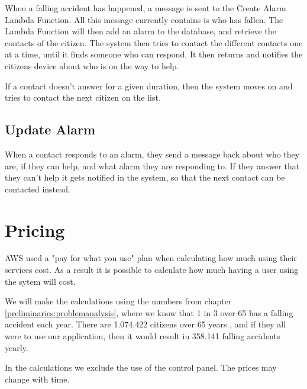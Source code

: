 When a falling accident has happened, a message is sent to the Create Alarm Lambda Function. All this message currently contains is who has fallen. The Lambda Function will then add an alarm to the database, and retrieve the contacts of the citizen. The system then tries to contact the different contacts one at a time, until it finds someone who can respond. It then returns and notifies the citizens device about who is on the way to help.

If a contact doesn't answer for a given duration, then the system moves on and tries to contact the next citizen on the list.

\subsection{Update Alarm}

When a contact responds to an alarm, they send a message back about who they are, if they can help, and what alarm they are responding to. If they answer that they can't help it gets notified in the system, so that the next contact can be contacted instead.





















\iffalse

\section{Pricing}

AWS used a "pay for what you use" plan when calculating how much using their services cost. As a result it is possible to calculate how much having a user using the sytem will cost.

We will make the calculations using the numbers from chapter \ref{preliminaries:problemanalysis}, where we know that 1 in 3 over 65 has a falling accident each year. There are 1.074.422 citizens over 65 years \cite{numberofelders}, and if they all were to use our application, then it would result in 358.141 falling accidents yearly.

In the calculations we exclude the use of the control panel. The prices may change with time.

